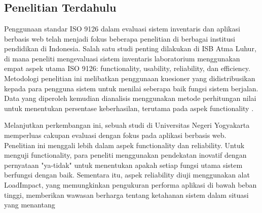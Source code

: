 %
%
%
%

\chapter{\babDua}

\section{Penelitian Terdahulu}

Penggunaan standar ISO 9126 dalam evaluasi sistem inventaris dan aplikasi berbasis web telah menjadi fokus beberapa penelitian di berbagai institusi pendidikan di Indonesia. Salah satu studi penting dilakukan di ISB Atma Luhur, di mana peneliti mengevaluasi sistem inventaris laboratorium menggunakan empat aspek utama ISO 9126: functionality, usability, reliability, dan efficiency. Metodologi penelitian ini melibatkan penggunaan kuesioner yang didistribusikan kepada para pengguna sistem untuk menilai seberapa baik fungsi sistem berjalan. Data yang diperoleh kemudian dianalisis menggunakan metode perhitungan nilai untuk menentukan persentase keberhasilan, terutama pada aspek functionality \cite{alkodri2023pengaplikasian}.

Melanjutkan perkembangan ini, sebuah studi di Universitas Negeri Yogyakarta memperluas cakupan evaluasi dengan fokus pada aplikasi berbasis web. Penelitian ini menggali lebih dalam aspek functionality dan reliability. Untuk menguji functionality, para peneliti menggunakan pendekatan inovatif dengan pernyataan "ya-tidak" untuk menentukan apakah setiap fungsi utama sistem berfungsi dengan baik. Sementara itu, aspek reliability diuji menggunakan alat LoadImpact, yang memungkinkan pengukuran performa aplikasi di bawah beban tinggi, memberikan wawasan berharga tentang ketahanan sistem dalam situasi yang menantang \cite{dewi2017quality}

